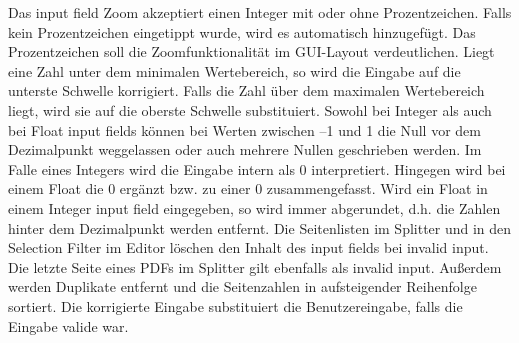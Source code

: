 Das input field Zoom akzeptiert einen Integer mit oder ohne Prozentzeichen. Falls kein Prozentzeichen eingetippt wurde, wird es automatisch hinzugefügt. Das Prozentzeichen soll die Zoomfunktionalität im GUI-Layout verdeutlichen. Liegt eine Zahl unter dem minimalen Wertebereich, so wird die Eingabe auf die unterste Schwelle korrigiert. Falls die Zahl über dem maximalen Wertebereich liegt, wird sie auf die oberste Schwelle substituiert. Sowohl bei Integer als auch bei Float input fields können bei Werten zwischen –1 und 1 die Null vor dem Dezimalpunkt weggelassen oder auch mehrere Nullen geschrieben werden. Im Falle eines Integers wird die Eingabe intern als 0 interpretiert. Hingegen wird bei einem Float die 0 ergänzt bzw. zu einer 0 zusammengefasst. Wird ein Float in einem Integer input field eingegeben, so wird immer abgerundet, d.h. die Zahlen hinter dem Dezimalpunkt werden entfernt. Die Seitenlisten im Splitter und in den Selection Filter im Editor löschen den Inhalt des input fields bei invalid input. Die letzte Seite eines PDFs im Splitter gilt ebenfalls als invalid input. Außerdem werden Duplikate entfernt und die Seitenzahlen in aufsteigender Reihenfolge sortiert. Die korrigierte Eingabe substituiert die Benutzereingabe, falls die Eingabe valide war. 

